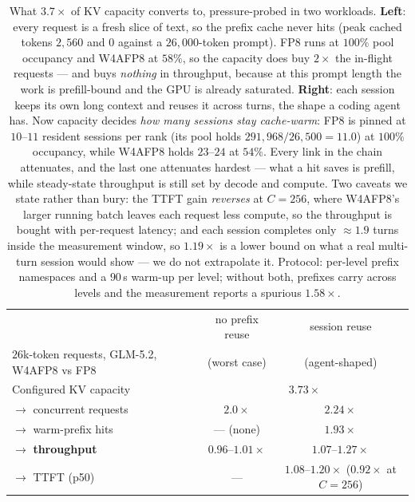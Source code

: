 \documentclass[11pt]{article}
\renewcommand{\_}{\WCorigunderscore\allowbreak}
\begin{document}
\begin{table}[htbp]\centering\small
\setlength{\tabcolsep}{5pt}
\begin{tabular}{lcc}
\toprule
& no prefix reuse & session reuse\\
$26$k-token requests, GLM-5.2, W4AFP8 vs FP8 & (worst case) & (agent-shaped)\\
\midrule
Configured KV capacity            & \multicolumn{2}{c}{$3.73\times$}\\
$\rightarrow$ concurrent requests & $2.0\times$ & $2.24\times$\\
$\rightarrow$ warm-prefix hits    & --- (none)  & $1.93\times$\\
$\rightarrow$ \textbf{throughput} & $\mathbf{0.96}$--$\mathbf{1.01\times}$
                                  & $\mathbf{1.07}$--$\mathbf{1.27\times}$\\
$\rightarrow$ TTFT (p50)          & --- & $1.08$--$1.20\times$ ($0.92\times$ at $C{=}256$)\\
\bottomrule
\end{tabular}
\caption{What $3.7\times$ of KV capacity converts to, pressure-probed in
two workloads. \textbf{Left}: every request is a fresh slice of text, so
the prefix cache never hits (peak cached tokens $2{,}560$ and $0$ against
a $26{,}000$-token prompt). FP8 runs at $100\%$ pool occupancy and
W4AFP8 at $58\%$, so the capacity does buy $2\times$ the in-flight
requests --- and buys \emph{nothing} in throughput, because at this
prompt length the work is prefill-bound and the GPU is already
saturated. \textbf{Right}: each session keeps its own long context and
reuses it across turns, the shape a coding agent has. Now capacity
decides \emph{how many sessions stay cache-warm}: FP8 is pinned at
$10$--$11$ resident sessions per rank (its pool holds
$291{,}968/26{,}500=11.0$) at $100\%$ occupancy, while W4AFP8 holds
$23$--$24$ at $54\%$. Every link in the chain attenuates, and the last
one attenuates hardest --- what a hit saves is prefill, while steady-state
throughput is still set by decode and compute. Two caveats we state
rather than bury: the TTFT gain \emph{reverses} at $C{=}256$, where
W4AFP8's larger running batch leaves each request less compute, so the
throughput is bought with per-request latency; and each session completes
only $\approx1.9$ turns inside the measurement window, so $1.19\times$ is
a lower bound on what a real multi-turn session would show --- we do not
extrapolate it. Protocol: per-level prefix namespaces and a $90$\,s
warm-up per level; without both, prefixes carry across levels and the
measurement reports a spurious $1.58\times$.}
\label{tab:convert}
\end{table}
\end{document}
